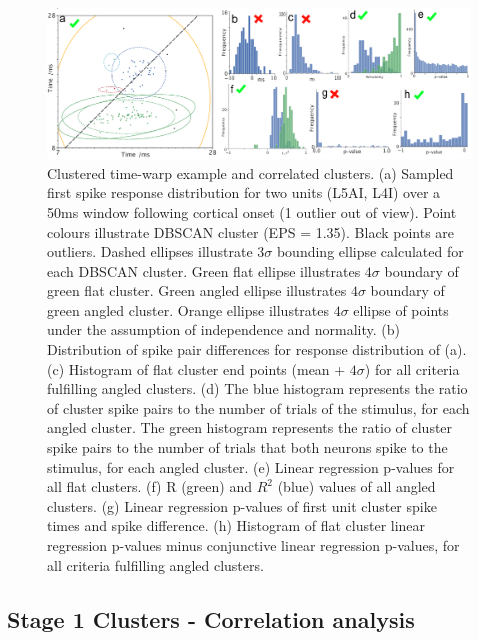 \documentclass{article}
\begin{document}

\begin{figure}[t!]
\centering
\includegraphics[width=\textwidth]{Figure3.pdf}
\caption{Clustered time-warp example and correlated clusters. (a) Sampled first spike response distribution for two units (L5AI, L4I) over a 50ms window following cortical onset (1 outlier out of view). Point colours illustrate DBSCAN cluster (EPS = 1.35). Black points are outliers. Dashed ellipses illustrate $3\sigma$ bounding ellipse calculated for each DBSCAN cluster. Green flat ellipse illustrates $4\sigma$ boundary of green flat cluster. Green angled ellipse illustrates $4\sigma$ boundary of green angled cluster. Orange ellipse illustrates $4\sigma$ ellipse of points under the assumption of independence and normality. (b) Distribution of spike pair differences for response distribution of (a). (c) Histogram of flat cluster end points (mean + $4\sigma$) for all criteria fulfilling angled clusters. (d) The blue histogram represents the ratio of cluster spike pairs to the number of trials of the stimulus, for each angled cluster. The green histogram represents the ratio of cluster spike pairs to the number of trials that both neurons spike to the stimulus, for each angled cluster. (e) Linear regression p-values for all flat clusters. (f) R (green) and $R^2$ (blue) values of all angled clusters. (g) Linear regression p-values of first unit cluster spike times and spike difference. (h) Histogram of flat cluster linear regression p-values minus conjunctive linear regression p-values, for all criteria fulfilling angled clusters.}
\label{fig:fig3}
\end{figure}



\subsection*{Stage 1 Clusters - Correlation analysis}
\end{document}
